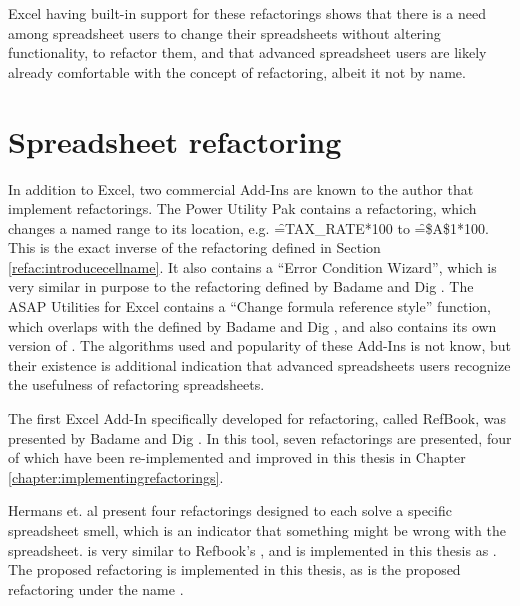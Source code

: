Excel having built-in support for these refactorings shows that there is a need among spreadsheet users to change their spreadsheets without altering functionality, to refactor them, and that advanced spreadsheet users are likely already comfortable with the concept of refactoring, albeit it not by name.

\section{Spreadsheet refactoring}

In addition to Excel, two commercial Add-Ins are known to the author that implement refactorings.
The Power Utility Pak \cite{PuPv7} contains a  refactoring, which changes a named range to its location, e.g. \f{=TAX_RATE*100} to \f{=\$A\$1*100}.
This is the exact inverse of the  refactoring defined in Section \ref{refac:introducecellname}.
It also contains a ``Error Condition Wizard'', which is very similar in purpose to the  refactoring defined by Badame and Dig \cite{badame2012refactoring}.
The ASAP Utilities for Excel \cite{ASAP5} contains a ``Change formula reference style'' function, which overlaps with the  defined by Badame and Dig \cite{badame2012refactoring}, and also contains its own version of .
The algorithms used and popularity of these Add-Ins is not know, but their existence is additional indication that advanced spreadsheets users recognize the usefulness of refactoring spreadsheets.

The first Excel Add-In specifically developed for refactoring, called RefBook, was presented by Badame and Dig \cite{badame2012refactoring}.
In this tool, seven refactorings are presented, four of which have been re-implemented and improved in this thesis in Chapter \ref{chapter:implementingrefactorings}.

Hermans et. al \cite{hermans2014detecting} present four refactorings designed to each solve a specific spreadsheet smell, which is an indicator that something might be wrong with the spreadsheet.
 is very similar to Refbook's , and is implemented in this thesis as .
The proposed  refactoring is implemented in this thesis, as is the proposed  refactoring under the name .

